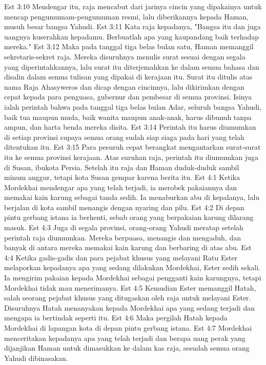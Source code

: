 Est 3:10  Mendengar itu, raja mencabut dari jarinya cincin yang dipakainya untuk mencap pengumumam-pengumuman resmi, lalu diberikannya kepada Haman, musuh besar bangsa Yahudi.
Est 3:11  Kata raja kepadanya, "Bangsa itu dan juga uangnya kuserahkan kepadamu. Berbuatlah apa yang kaupandang baik terhadap mereka."
Est 3:12  Maka pada tanggal tiga belas bulan satu, Haman memanggil sekretaris-sekret raja. Mereka disuruhnya menulis surat sesuai dengan segala yang diperintahkannya, lalu surat itu diterjemahkan ke dalam semua bahasa dan disalin dalam semua tulisan yang dipakai di kerajaan itu. Surat itu ditulis atas nama Raja Ahasyweros dan dicap dengan cincinnya, lalu dikirimkan dengan cepat kepada para penguasa, gubernur dan pembesar di semua provinsi. Isinya ialah perintah bahwa pada tanggal tiga belas bulan Adar, seluruh bangsa Yahudi, baik tua maupun muda, baik wanita maupun anak-anak, harus dibunuh tanpa ampun, dan harta benda mereka disita.
Est 3:14  Perintah itu harus diumumkan di setiap provinsi supaya semua orang sudah siap siaga pada hari yang telah ditentukan itu.
Est 3:15  Para pesuruh cepat berangkat mengantarkan surat-surat itu ke semua provinsi kerajaan. Atas suruhan raja, perintah itu diumumkan juga di Susan, ibukota Persia. Setelah itu raja dan Haman duduk-duduk sambil minum anggur, tetapi kota Susan gempar karena berita itu.
Est 4:1  Ketika Mordekhai mendengar apa yang telah terjadi, ia merobek pakaiannya dan memakai kain karung sebagai tanda sedih. Ia menaburkan abu di kepalanya, lalu berjalan di kota sambil menangis dengan nyaring dan pilu.
Est 4:2  Di depan pintu gerbang istana ia berhenti, sebab orang yang berpakaian karung dilarang masuk.
Est 4:3  Juga di segala provinsi, orang-orang Yahudi meratap setelah perintah raja diumumkan. Mereka berpuasa, menangis dan mengaduh, dan banyak di antara mereka memakai kain karung dan berbaring di atas abu.
Est 4:4  Ketika gadis-gadis dan para pejabat khusus yang melayani Ratu Ester melaporkan kepadanya apa yang sedang dilakukan Mordekhai, Ester sedih sekali. Ia mengirim pakaian kepada Mordekhai sebagai pengganti kain karungnya, tetapi Mordekhai tidak mau menerimanya.
Est 4:5  Kemudian Ester memanggil Hatah, salah seorang pejabat khusus yang ditugaskan oleh raja untuk melayani Ester. Disuruhnya Hatah menanyakan kepada Mordekhai apa yang sedang terjadi dan mengapa ia bertindak seperti itu.
Est 4:6  Maka pergilah Hatah kepada Mordekhai di lapangan kota di depan pintu gerbang istana.
Est 4:7  Mordekhai menceritakan kepadanya apa yang telah terjadi dan berapa uang perak yang dijanjikan Haman untuk dimasukkan ke dalam kas raja, sesudah semua orang Yahudi dibinasakan.
